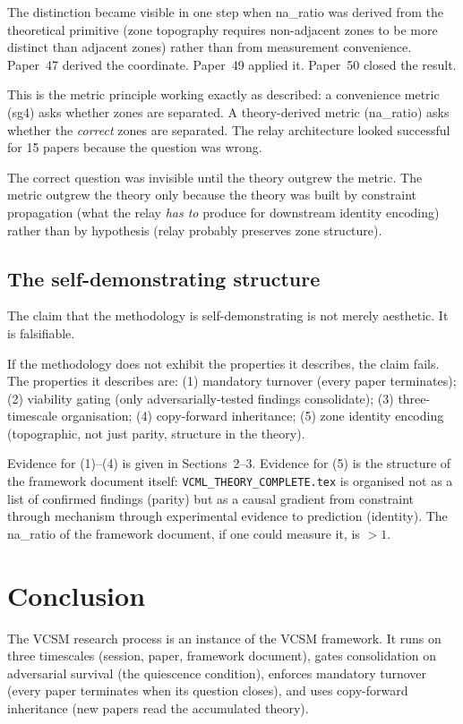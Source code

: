 \documentclass[11pt,a4paper]{article}
\begin{document}
The distinction became visible in one step when na\_ratio was derived from the
theoretical primitive (zone topography requires non-adjacent zones to be more
distinct than adjacent zones) rather than from measurement convenience.
Paper~47 derived the coordinate. Paper~49 applied it. Paper~50 closed the result.

This is the metric principle working exactly as described:
a convenience metric (sg4) asks whether zones are separated.
A theory-derived metric (na\_ratio) asks whether the \emph{correct} zones are separated.
The relay architecture looked successful for 15 papers because the question was wrong.

The correct question was invisible until the theory outgrew the metric.
The metric outgrew the theory only because the theory was built by constraint
propagation (what the relay \emph{has to} produce for downstream identity encoding)
rather than by hypothesis (relay probably preserves zone structure).

\subsection{The self-demonstrating structure}

The claim that the methodology is self-demonstrating is not merely aesthetic.
It is falsifiable.

If the methodology does not exhibit the properties it describes, the claim fails.
The properties it describes are:
(1) mandatory turnover (every paper terminates);
(2) viability gating (only adversarially-tested findings consolidate);
(3) three-timescale organisation;
(4) copy-forward inheritance;
(5) zone identity encoding (topographic, not just parity, structure in the theory).

Evidence for (1)--(4) is given in Sections~2--3.
Evidence for (5) is the structure of the framework document itself:
\texttt{VCML\_THEORY\_COMPLETE.tex} is organised not as a list of confirmed findings
(parity) but as a causal gradient from constraint through mechanism through
experimental evidence to prediction (identity).
The na\_ratio of the framework document, if one could measure it, is $>1$.

\section{Conclusion}

The VCSM research process is an instance of the VCSM framework.
It runs on three timescales (session, paper, framework document),
gates consolidation on adversarial survival (the quiescence condition),
enforces mandatory turnover (every paper terminates when its question closes),
and uses copy-forward inheritance (new papers read the accumulated theory).
\end{document}
